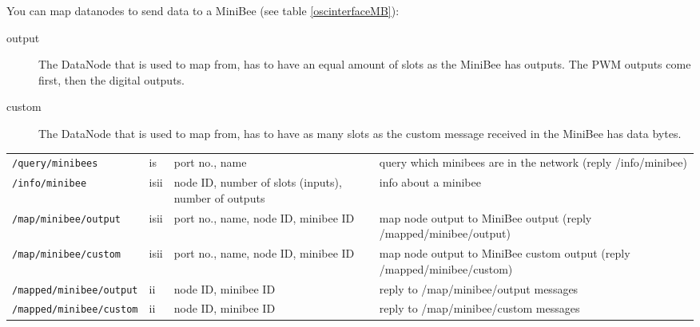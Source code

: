 \documentclass[letterpaper,10pt]{article}
\begin{document}
You can map datanodes to send data to a MiniBee (see table \ref{oscinterfaceMB}):
\begin{description}
 \item [output] The DataNode that is used to map from, has to have an equal amount of slots as the MiniBee has outputs. The PWM outputs come first, then the digital outputs.
 \item [custom] The DataNode that is used to map from, has to have as many slots as the custom message received in the MiniBee has data bytes.
\end{description}



\begin{sidewaystable}[!tbp]
\small
\begin{center}
\begin{tabular}{|llll|}
\hline
\verb|/query/minibees| & is & port no., name& query which minibees are in the network (reply /info/minibee) \\
\verb|/info/minibee| & isii & node ID, number of slots (inputs), number of outputs & info about a minibee \\
\verb|/map/minibee/output| & isii & port no., name, node ID, minibee ID & map node output to MiniBee output (reply /mapped/minibee/output)\\
\verb|/map/minibee/custom| & isii & port no., name, node ID, minibee ID & map node output to MiniBee custom output (reply /mapped/minibee/custom)\\
\verb|/mapped/minibee/output| & ii & node ID, minibee ID & reply to /map/minibee/output messages \\
\verb|/mapped/minibee/custom| & ii & node ID, minibee ID & reply to /map/minibee/custom messages \\
\hline
\end{tabular}
\end{center}
\caption{OSC namespace for the Data Network - interaction with MiniBees. }
\label{oscinterfaceMB}
\end{sidewaystable}
\end{document}
